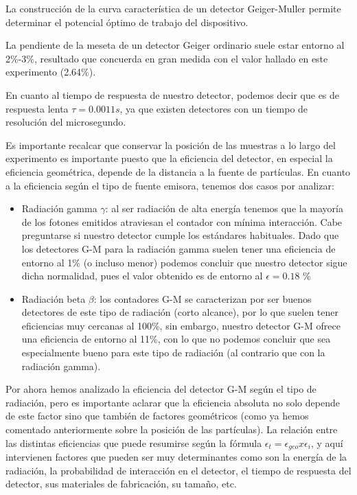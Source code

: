\documentclass[11pt]{article}
\begin{document}
La construcción de la curva característica de un detector Geiger-Muller
permite determinar el potencial óptimo de trabajo del dispositivo.

La pendiente de la meseta de un detector Geiger ordinario suele estar
entorno al 2\%-3\%, resultado que concuerda en gran medida con el valor
hallado en este experimento (2.64\%).

En cuanto al tiempo de respuesta de nuestro detector, podemos decir que
es de respuesta lenta \(\tau = 0.0011s\), ya que existen detectores con
un tiempo de resolución del microsegundo.

Es importante recalcar que conservar la posición de las muestras a lo
largo del experimento es importante puesto que la eficiencia del
detector, en especial la eficiencia geométrica, depende de la distancia
a la fuente de partículas. En cuanto a la eficiencia según el tipo de
fuente emisora, tenemos dos casos por analizar:

\begin{itemize}
\item
  Radiación gamma \(\gamma\): al ser radiación de alta energía tenemos
  que la mayoría de los fotones emitidos atraviesan el contador con
  mínima interacción. Cabe preguntarse si nuestro detector cumple los
  estándares habituales. Dado que los detectores G-M para la radiación
  gamma suelen tener una eficiencia de entorno al 1\% (o incluso menor)
  podemos concluir que nuestro detector sigue dicha normalidad, pues el
  valor obtenido es de entorno al \(\epsilon = 0.18\) \%
\item
  Radiación beta \(\beta\): los contadores G-M se caracterizan por ser
  buenos detectores de este tipo de radiación (corto alcance), por lo
  que suelen tener eficiencias muy cercanas al 100\%, sin embargo,
  nuestro detector G-M ofrece una eficiencia de entorno al 11\%, con lo
  que no podemos concluir que sea especialmente bueno para este tipo de
  radiación (al contrario que con la radiación gamma).
\end{itemize}

Por ahora hemos analizado la eficiencia del detector G-M según el tipo
de radiación, pero es importante aclarar que la eficiencia absoluta no
solo depende de este factor sino que también de factores geométricos
(como ya hemos comentado anteriormente sobre la posición de las
partículas). La relación entre las distintas eficiencias que puede
resumirse según la fórmula
\(\epsilon_t = \epsilon_{geo} x \epsilon_{i}\), y aquí intervienen
factores que pueden ser muy determinantes como son la energía de la
radiación, la probabilidad de interacción en el detector, el tiempo de
respuesta del detector, sus materiales de fabricación, su tamaño, etc.
\end{document}
